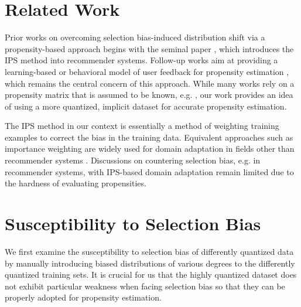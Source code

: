 \documentclass{article}
\begin{document}
\section{Related Work}
Prior works on overcoming selection bias-induced distribution shift via a propensity-based approach begins with the seminal paper \cite{schnabel2016recommendations}, which introduces the IPS method into recommender systems. Follow-up works aim at providing a learning-based or behavioral model of user feedback for propensity estimation \cite{joachims2017unbiased,yang2018unbiased}, which remains the central concern of this approach. While many works rely on a propensity matrix that is assumed to be known, e.g. \cite{something}, our work provides an idea of using a more quantized, implicit dataset for accurate propensity estimation.

The IPS method in our context is essentially a method of weighting training examples to correct the bias in the training data. Equivalent approaches such as importance weighting are widely used for domain adaptation in fields other than recommender systems \cite{sugiyama2007covariate,zhang2018importance}. 
Discussions on countering selection bias, e.g. in recommender systems, with IPS-based domain adaptation remain limited due to the hardness of evaluating propensities.

\section{Susceptibility to Selection Bias}
We first examine the susceptibility to selection bias of differently quantized data by manually introducing biased distributions of various degrees to the differently quantized training sets. It is crucial for us that the highly quantized dataset does not exhibit particular weakness when facing selection bias so that they can be properly adopted for propensity estimation.
\end{document}
